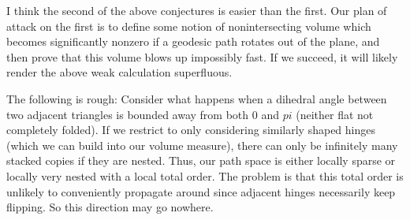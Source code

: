 \documentclass[11pt]{article}
\begin{document}
I think the second of the above conjectures is easier than the first.  Our plan of attack on the first is to
define some notion of nonintersecting volume which becomes significantly nonzero if a geodesic path rotates
out of the plane, and then prove that this volume blows up impossibly fast.  If we succeed, it will likely
render the above weak calculation superfluous.

The following is rough: Consider what happens when a dihedral angle between two adjacent triangles is bounded
away from both 0 and $pi$ (neither flat not completely folded).  If we restrict to only considering similarly
shaped hinges (which we can build into our volume measure), there can only be infinitely many stacked copies
if they are nested.  Thus, our path space is either locally sparse or locally very nested with a local total order.
The problem is that this total order is unlikely to conveniently propagate around since adjacent hinges necessarily
keep flipping.  So this direction may go nowhere.
\end{document}
